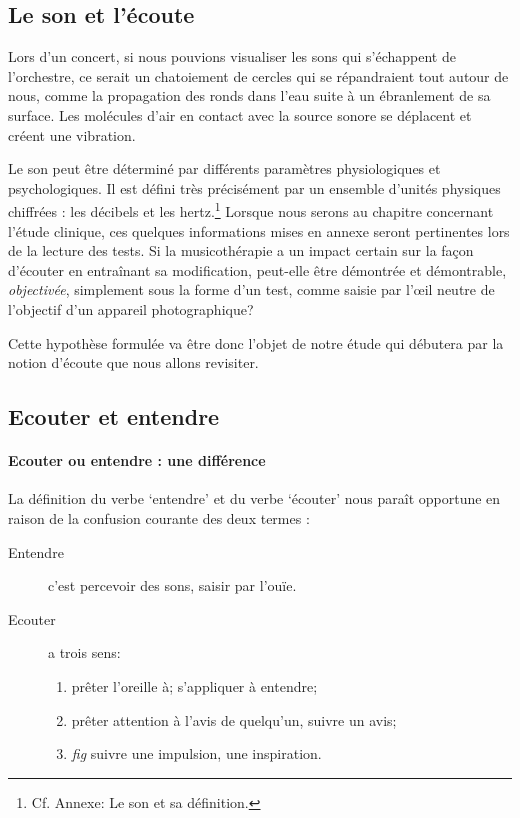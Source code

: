 
\subsection{Le son et l'écoute}

Lors d'un concert, si nous pouvions visualiser les sons qui
s'échappent de l'orchestre, ce serait un chatoiement de cercles qui se
répandraient tout autour de nous, comme
la propagation des
ronds dans l'eau suite à un ébranlement de sa surface.
Les molécules d'air en contact avec la source sonore se déplacent et
créent une vibration\autocite[p. 183]{bencivelli:pourquoi,}.


Le son peut être déterminé par différents paramètres
physiologiques et psychologiques.
Il est défini très précisément par un ensemble d'unités physiques chiffrées
: les décibels  et les hertz.\footnote{Cf. Annexe: Le son et sa
  définition.}
Lorsque nous serons au chapitre concernant l'étude clinique,
ces quelques informations mises en annexe seront pertinentes lors de la lecture des tests.
Si la
musicothérapie a un impact certain sur la façon d'écouter en
entraînant sa
modification, peut-elle être  démontrée et démontrable, \textsl{objectivée},
simplement sous la forme d'un test, comme saisie par
l'\oe il neutre de l'objectif d'un appareil
photographique?

Cette hypothèse formulée va être donc l'objet de notre étude qui
débutera par la notion d'écoute que nous allons revisiter.



\subsection{Ecouter et entendre}
\paragraph{Ecouter ou entendre : une différence}

La définition du verbe `entendre' et du verbe `écouter'
\autocite[pp. 361--385]{hachette:dictionnaire} nous paraît opportune
en raison de la confusion courante des deux termes :
\begin{description}
\item[Entendre] c'est  percevoir des sons, saisir par l'ouïe.
\item[Ecouter] a trois sens:
\begin{enumerate}
	\item prêter l'oreille à; s'appliquer à entendre;
	\item prêter attention à l'avis de quelqu'un, suivre un avis;
	\item \emph{fig} suivre une impulsion,	une inspiration.
\end{enumerate}
\end{description}


